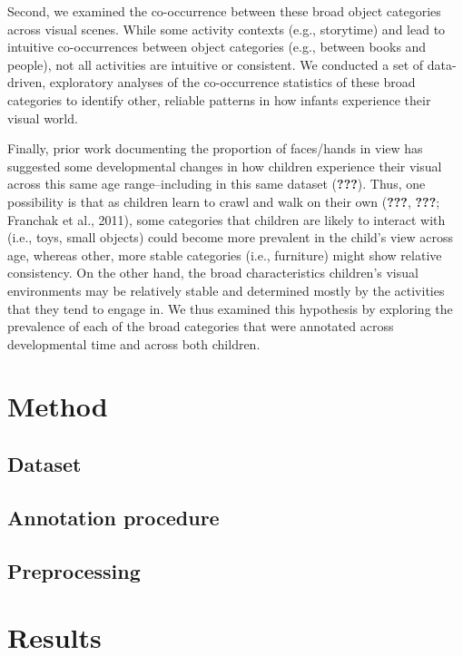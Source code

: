 \documentclass[10pt, letterpaper]{article}
\begin{document}
Second, we examined the co-occurrence between these broad object
categories across visual scenes. While some activity contexts (e.g.,
storytime) and lead to intuitive co-occurrences between object
categories (e.g., between books and people), not all activities are
intuitive or consistent. We conducted a set of data-driven, exploratory
analyses of the co-occurrence statistics of these broad categories to
identify other, reliable patterns in how infants experience their visual
world.

Finally, prior work documenting the proportion of faces/hands in view
has suggested some developmental changes in how children experience
their visual across this same age range--including in this same dataset
({\textbf{???}}). Thus, one possibility is that as children learn to
crawl and walk on their own ({\textbf{???}}, {\textbf{???}}; Franchak et
al., 2011), some categories that children are likely to interact with
(i.e., toys, small objects) could become more prevalent in the child's
view across age, whereas other, more stable categories (i.e., furniture)
might show relative consistency. On the other hand, the broad
characteristics children's visual environments may be relatively stable
and determined mostly by the activities that they tend to engage in. We
thus examined this hypothesis by exploring the prevalence of each of the
broad categories that were annotated across developmental time and
across both children.

\section{Method}\label{method}

\subsection{Dataset}\label{dataset}

\subsection{Annotation procedure}\label{annotation-procedure}

\subsection{Preprocessing}\label{preprocessing}

\section{Results}\label{results}
\end{document}
